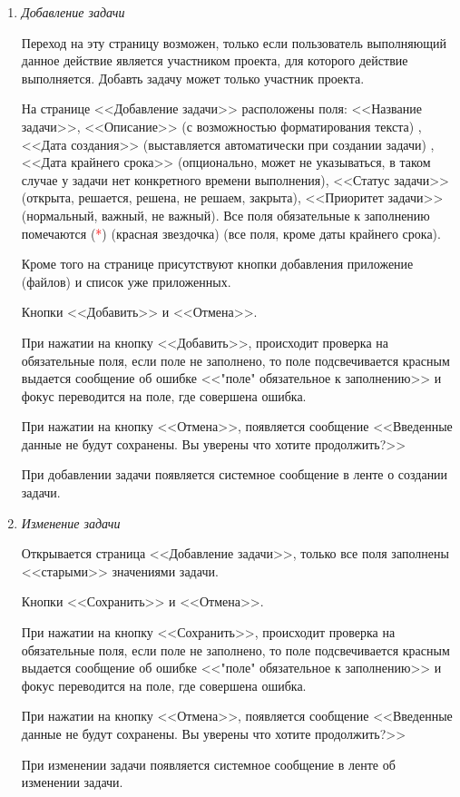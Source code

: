 \documentclass[14pt,a4paper]{extarticle}
\begin{document}
\begin{enumerate}
		\item {\it Добавление задачи}
		\par Переход на эту страницу возможен, только если пользователь выполняющий данное действие является участником проекта, для которого действие выполняется. Добавть задачу может только участник проекта.
		\par На странице <<Добавление задачи>> расположены поля: <<Название задачи>>, <<Описание>> (с возможностью форматирования текста) , <<Дата создания>> (выставляется автоматически при создании задачи) , <<Дата крайнего срока>> (опционально, может не указываться, в таком случае у задачи нет конкретного времени выполнения), <<Статус задачи>> (открыта, решается, решена, не решаем, закрыта), <<Приоритет задачи>> (нормальный, важный, не важный). Все поля обязательные к заполнению помечаются (\textcolor{red}{*}) (красная звездочка) (все поля, кроме даты крайнего срока).
		\par Кроме того на странице присутствуют кнопки добавления приложение (файлов) и список уже приложенных.
		\par Кнопки <<Добавить>> и <<Отмена>>.
		\par При нажатии на кнопку <<Добавить>>, происходит проверка на обязательные поля, если поле не заполнено, то поле подсвечивается красным выдается сообщение об ошибке <<"поле" обязательное к заполнению>> и фокус переводится на поле, где совершена ошибка.
		\par При нажатии на кнопку <<Отмена>>, появляется сообщение <<Введенные данные не будут сохранены. Вы уверены что хотите продолжить?>>
		\par При добавлении задачи появляется системное сообщение в ленте о создании задачи.

		\item {\it Изменение задачи}
		\par Открывается страница <<Добавление задачи>>, только все поля заполнены <<старыми>> значениями задачи.
		\par Кнопки <<Сохранить>> и <<Отмена>>.
		\par При нажатии на кнопку <<Сохранить>>, происходит проверка на обязательные поля, если поле не заполнено, то поле подсвечивается красным выдается сообщение об ошибке <<"поле" обязательное к заполнению>> и фокус переводится на поле, где совершена ошибка.
		\par При нажатии на кнопку <<Отмена>>, появляется сообщение <<Введенные данные не будут сохранены. Вы уверены что хотите продолжить?>>
		\par При изменении задачи появляется системное сообщение в ленте об изменении задачи.
		

\end{enumerate}
\end{document}
